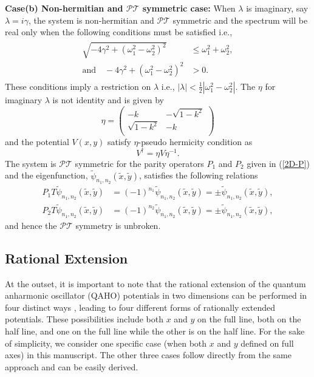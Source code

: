 \documentclass[a4paper, 12pt]{article}
\newcommand{\td}[1]{\tilde{#1}}
\begin{document}
{\bf Case(b) Non-hermitian and $\mathcal{PT}$ symmetric case:} When $\lambda$ is imaginary, say $\lambda=i\gamma$, the system is non-hermitian and $\mathcal{PT}$ symmetric and the spectrum will be real only when the following conditions must be satisfied i.e.,
\begin{align}\label{img2D}
  \begin{split}
    \sqrt{-4\gamma ^2+(\omega _1^2-\omega _2^2)^2}&\le\omega _1^2+\omega _2^2,\\
   \mbox{and}\quad -4 \gamma ^2+(\omega _1^2-\omega _2^2)^2&>0.
  \end{split}
\end{align}
These conditions imply a restriction on $\lambda$ i.e., $|\lambda|< \frac{1}{2} |\omega _1^2-\omega _2^2|$.
The $\eta$ for imaginary $\lambda$ is not identity and is given by 
\begin{equation}
  \eta=\left(
\begin{array}{cc}
 -k & -\sqrt{1-k^2}  \\
 \sqrt{1-k^2}  & -k \\
\end{array}
\right)
\end{equation}
and the potential $V(x,y)$ satisfy $\eta$-pseudo hermicity condition as
\begin{equation}
  V^{\dagger}=\eta V \eta^{-1}.
\end{equation}
The system is $\mathcal{PT}$ symmetric for the parity operators $P_1$ and $P_2$ given in (\ref{2D-P}) and the eigenfunction, $\tilde{\psi}_{n_1,n_2}(\td{x},\td{y})$, satisfies the following relations \cite{pollett1995elliptic}
\begin{align*}
P_1T\tilde{\psi}_{n_1,n_2}(\td{x},\td{y}) &= (-1)^{n_1}\tilde{\psi}_{n_1,n_2}(\td{x},\td{y}) = \pm\tilde{\psi}_{n_1,n_2}(\td{x},\td{y}), \\
P_2T\tilde{\psi}_{n_1,n_2}(\td{x},\td{y})&= (-1)^{n_2}\tilde{\psi}_{n_1,n_2}(\td{x},\td{y}) = \pm\tilde{\psi}_{n_1,n_2}(\td{x},\td{y}),
\end{align*}
and hence the $\mathcal{PT}$ symmetry is unbroken.

\subsection{Rational Extension}
At the outset, it is important to note that the rational extension of the quantum anharmonic oscillator (QAHO) potentials in two dimensions can be performed in four distinct ways \cite{Kumar:2024tsz}, leading to four different forms of rationally extended potentials. These possibilities include both $x$ and $y$ on the full line, both on the half line, and one on the full line while the other is on the half line. For the sake of simplicity, we consider one specific case (when both $x$ and $y$ defined on full axes) in this manuscript. The other three cases follow directly from the same approach and can be easily derived. 
\end{document}
